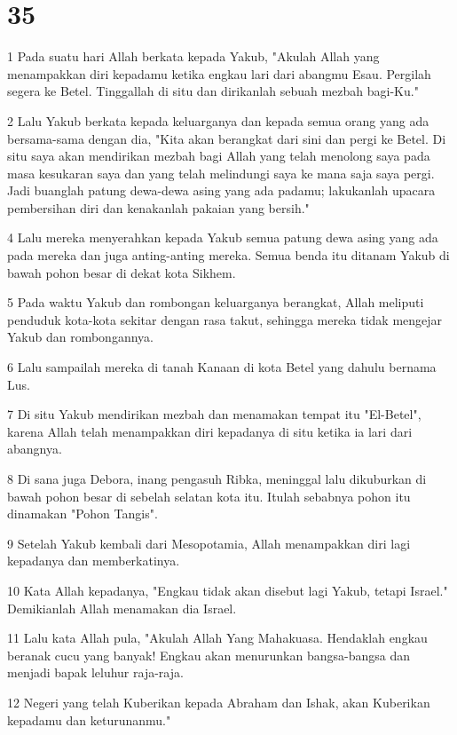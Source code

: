 \chapter{35}

\par 1 Pada suatu hari Allah berkata kepada Yakub, "Akulah Allah yang menampakkan diri kepadamu ketika engkau lari dari abangmu Esau. Pergilah segera ke Betel. Tinggallah di situ dan dirikanlah sebuah mezbah bagi-Ku."
\par 2 Lalu Yakub berkata kepada keluarganya dan kepada semua orang yang ada bersama-sama dengan dia, "Kita akan berangkat dari sini dan pergi ke Betel. Di situ saya akan mendirikan mezbah bagi Allah yang telah menolong saya pada masa kesukaran saya dan yang telah melindungi saya ke mana saja saya pergi. Jadi buanglah patung dewa-dewa asing yang ada padamu; lakukanlah upacara pembersihan diri dan kenakanlah pakaian yang bersih."
\par 4 Lalu mereka menyerahkan kepada Yakub semua patung dewa asing yang ada pada mereka dan juga anting-anting mereka. Semua benda itu ditanam Yakub di bawah pohon besar di dekat kota Sikhem.
\par 5 Pada waktu Yakub dan rombongan keluarganya berangkat, Allah meliputi penduduk kota-kota sekitar dengan rasa takut, sehingga mereka tidak mengejar Yakub dan rombongannya.
\par 6 Lalu sampailah mereka di tanah Kanaan di kota Betel yang dahulu bernama Lus.
\par 7 Di situ Yakub mendirikan mezbah dan menamakan tempat itu "El-Betel", karena Allah telah menampakkan diri kepadanya di situ ketika ia lari dari abangnya.
\par 8 Di sana juga Debora, inang pengasuh Ribka, meninggal lalu dikuburkan di bawah pohon besar di sebelah selatan kota itu. Itulah sebabnya pohon itu dinamakan "Pohon Tangis".
\par 9 Setelah Yakub kembali dari Mesopotamia, Allah menampakkan diri lagi kepadanya dan memberkatinya.
\par 10 Kata Allah kepadanya, "Engkau tidak akan disebut lagi Yakub, tetapi Israel." Demikianlah Allah menamakan dia Israel.
\par 11 Lalu kata Allah pula, "Akulah Allah Yang Mahakuasa. Hendaklah engkau beranak cucu yang banyak! Engkau akan menurunkan bangsa-bangsa dan menjadi bapak leluhur raja-raja.
\par 12 Negeri yang telah Kuberikan kepada Abraham dan Ishak, akan Kuberikan kepadamu dan keturunanmu."
